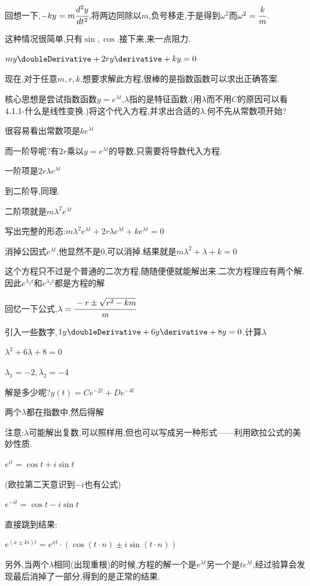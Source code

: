 {{{回想一下,$-ky = m\cfrac{d^2y}{dt^2}$,将两边同除以$m$,负号移走,于是得到$\omega^2$而$\omega^2 = \cfrac{k}{m}$.

这种情况很简单,只有$\sin , \cos$.接下来,来一点阻力.

$my\doubleDerivative + 2ry\derivative + ky = 0$

现在,对于任意$m,r,k$.想要求解此方程,很棒的是指数函数可以求出正确答案.

核心思想是尝试指数函数$y = e^{\lambda t}$,$\lambda$指的是特征函数.(用$\lambda$而不用$C$的原因可以看4.1.1-什么是线性变换.)将这个代入方程,并求出合适的$\lambda$.何不先从常数项开始?

很容易看出常数项是$ke^{\lambda t}$

而一阶导呢?有$2r$乘以$y = e^{\lambda t}$的导数,只需要将导数代入方程.

一阶项是$2r\lambda e^{\lambda t}$

到二阶导,同理.

二阶项就是$m\lambda^2e^{\lambda t}$

写出完整的形态:$m\lambda^2e^{\lambda t} + 2r\lambda e^{\lambda t} + ke^{\lambda t} = 0$

消掉公因式$e^{\lambda t}$,他显然不是0,可以消掉.结果就是$m\lambda^2 + \lambda + k= 0$

这个方程只不过是个普通的二次方程,随随便便就能解出来.二次方程理应有两个解.因此$e^{\lambda_1 t}$和$e^{\lambda_2 t}$都是方程的解

回忆一下公式,$\lambda = \cfrac{-r \pm \sqrt{r^2 - km}}{m}$

引入一些数字,$1y\doubleDerivative + 6y\derivative + 8y = 0$.计算$\lambda$

$\lambda^2 + 6\lambda + 8 = 0$

$\lambda_1 = -2, \lambda_2 = -4$

解是多少呢?$y(t) = Ce^{-2t} + De^{-4t}$

两个$\lambda$都在指数中,然后得解

注意:$\lambda$可能解出复数,可以照样用,但也可以写成另一种形式——利用欧拉公式的美妙性质.

$e^{it} = \cos t + i\sin t$

(欧拉第二天意识到$-i$也有公式)

$e^{-it} = \cos t -i\sin t$

直接跳到结果:

$e^{(x \pm ki)t} = e^{xt}\cdot(\cos(t\cdot n) \pm i\sin(t\cdot n))$

另外,当两个$\lambda$相同(出现重根)的时候,方程的解一个是$e^{\lambda t}$另一个是$te^{\lambda t}$,经过验算会发现最后消掉了一部分,得到的是正常的结果.

}}}
